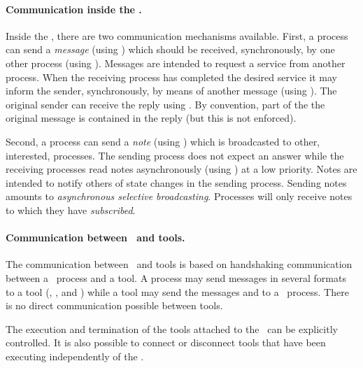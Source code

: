 \documentclass[a4,twoside,noweb]{article} %
\begin{document}
\paragraph{Communication inside the \TB.}
Inside the \TB, there are two communication mechanisms available.
First, a process can send a {\em message} (using ) which
should be received, synchronously, by one other process (using
). Messages are intended to request a service from another
process. When the receiving process has completed the desired service
it may inform the sender, synchronously, by means of another message (using
). The original sender can receive the reply using
.  By convention, part of the the original message is contained
in the reply (but this is not enforced).

Second, a process can send a {\em note} (using ) which is
broadcasted to other, interested, processes. The sending process does
not expect an answer while the receiving processes read notes
asynchronously (using ) at a low priority. Notes are
intended to notify others of state changes in the sending process.
Sending notes amounts to {\em asynchronous selective broadcasting}.
Processes will only receive notes to which they have {\em subscribed}.

\paragraph{Communication between \TB\ and tools.}
The communication between \TB\ and tools is based on handshaking
communication between a \TB\ process and a tool.  A process may send
messages in several formats to a tool (, ,
and ) while a tool may send the messages 
and  to a \TB\ process.  There is no direct communication
possible between tools.

The execution and termination of the tools attached to the \TB\ can be
explicitly controlled. It is also possible to connect or disconnect
tools that have been executing independently of the \TB.
\end{document}
